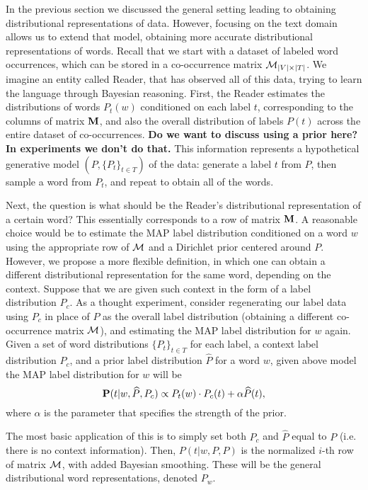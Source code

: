 In the previous section we discussed the general setting leading to
obtaining distributional representations of data. However, focusing on
the text domain allows us to extend that model, obtaining more
accurate distributional representations of words. Recall that we start
with a dataset of labeled word occurrences, which can be stored in a
co-occurrence matrix ${\mathcal M}_{|V|\times|T|}$. 
We imagine an entity
called Reader, that has observed all of this data, trying to learn the
language through Bayesian reasoning. First, the Reader estimates the
distributions of words $P_t(w)$ conditioned on each 
label $t$, corresponding to the columns of matrix $\operatorname{\mathbf{M}}$, and also
the overall distribution of labels $P(t)$ across the entire dataset of 
co-occurrences. 
{\bf Do we want to discuss using a prior here? In experiments we don't
  do that.}
This information represents a hypothetical generative model
$(P,\{P_t\}_{t\in T})$ of the
data: generate a label $t$ from $P$, then sample a word from $P_t$,
and repeat to obtain all of the words. 

Next, the question is what should be  
the Reader's distributional representation of a certain word? This
essentially corresponds to a row of matrix $\operatorname{\mathbf{M}}$. A reasonable choice
would be to estimate the MAP label distribution conditioned on a word
$w$ using the appropriate row of ${\mathcal M}$ and a Dirichlet prior centered
around $P$. However, we propose
a more flexible definition, in which one can obtain a different
distributional representation for the same word, depending on the
context. Suppose that we are given such context in the form of a label
distribution $P_c$. As a thought experiment, consider regenerating our
label data using $P_c$ in place of $P$ as the overall label
distribution (obtaining a different co-occurrence matrix ${\mathcal M}$), and
estimating the MAP label distribution for $w$ again.
\bep
Given a set of word distributions $\{P_t\}_{t\in T}$ for each label, a context label
distribution $P_c$, and a prior label distribution $\widehat{P}$ for a word $w$,
given above model the MAP label distribution for $w$ will be
\[\operatorname{\mathbf{P}}(t|w,\widehat{P},P_c) \propto P_t(w)\cdot P_c(t) + \alpha
\widehat{P}(t),\]
where $\alpha$ is the parameter that specifies the strength of the prior.
\eep

The most basic application of this is to simply set
both $P_c$ and $\widehat{P}$ equal to $P$ (i.e. there is no context
information). Then, $P(t|w,P,P)$ is the
normalized $i$-th row of matrix ${\mathcal M}$, with added Bayesian
smoothing. These will be the general distributional word
representations, denoted $P_w$. 

